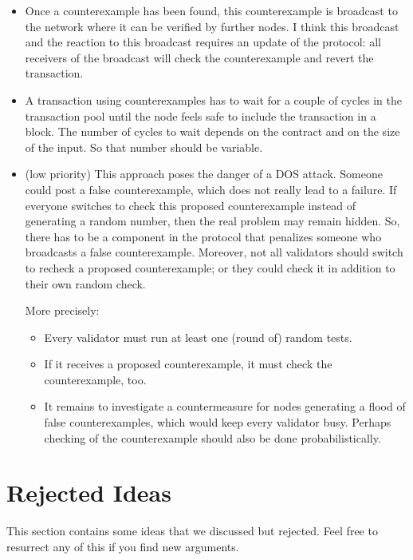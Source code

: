 \documentclass{article}
\begin{document}
\begin{itemize}
\item   Once a counterexample has been found,
  this counterexample is broadcast to the network where it can be verified by further
  nodes.  I think this broadcast and the reaction to this broadcast requires an update of
  the protocol: all receivers of the broadcast will check the counterexample and revert
  the transaction. 
\item A transaction using counterexamples has to
  wait for a couple of cycles in the transaction pool until the node feels safe to
  include the transaction in a block.
  The number of cycles to wait depends on the contract and on the size of the input.
  So that number should be variable.
\item (low priority) This approach poses the danger of a DOS attack. Someone could post a false
  counterexample, which does not really lead to a failure. If everyone switches to
  check this proposed counterexample instead of generating a random number, then the
  real problem may remain hidden. So, there has to be a component in the protocol that
  penalizes someone who broadcasts a false counterexample. Moreover, not all validators
  should switch to recheck a proposed counterexample; or they could check it in
  addition to their own random check.

  More precisely:
  \begin{itemize}
  \item Every validator must run at least one (round of) random tests.  
  \item If it receives a proposed counterexample, it must check the counterexample,
    too.
  \item It remains to investigate a countermeasure for nodes generating a flood of
    false counterexamples, which would keep every validator busy. Perhaps checking of
    the counterexample should also be done probabilistically.
  \end{itemize}
\end{itemize}

\section{Rejected Ideas}
\label{sec:rejected-ideas}

This section contains some ideas that we discussed but rejected. Feel free to resurrect
any of this if you find new arguments.
\end{document}
